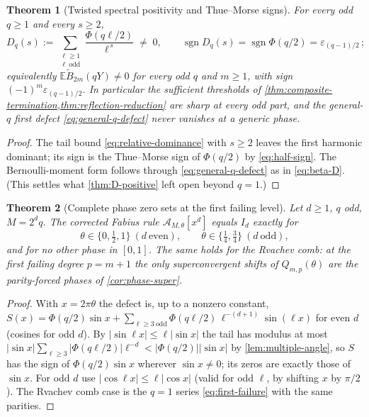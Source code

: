 \documentclass[11pt,oneside]{article}
\numberwithin{equation}{section}
\newtheorem{theorem}{Theorem}[section]
\theoremstyle{definition}
\theoremstyle{remark}
\newcommand{\E}{\mathbb E}
\newcommand{\eps}{\varepsilon}
\newcommand{\abs}[1]{\left\lvert #1\right\rvert}
\newcommand{\sgn}{\operatorname{sgn}}
\begin{document}
\begin{theorem}[Twisted spectral positivity and Thue--Morse signs]
\label{thm:twisted-D-positive}
For every odd $q\ge1$ and every $s\ge2$,
\begin{equation}
 D_q(s):=\sum_{\substack{\ell\ge1\\ \ell\ \mathrm{odd}}}
 \frac{\Phi(q\ell/2)}{\ell^{\,s}}
 \;\ne\;0,
 \qquad
 \sgn D_q(s)=\sgn\Phi(q/2)=\eps_{(q-1)/2}\,;
 \label{eq:twisted-positive}
\end{equation}
equivalently $\E\widetilde B_{2m}(qY)\ne0$ for every odd $q$ and
$m\ge1$, with sign $(-1)^{m}\eps_{(q-1)/2}$.  In particular the
sufficient thresholds of
\cref{thm:composite-termination,thm:reflection-reduction} are sharp
at \emph{every} odd part, and the general-$q$ first defect
\eqref{eq:general-q-defect} never vanishes at a generic phase.
\end{theorem}

\begin{proof}
The tail bound \eqref{eq:relative-dominance} with $s\ge2$ leaves the
first harmonic dominant; its sign is the Thue--Morse sign of
$\Phi(q/2)$ by \eqref{eq:half-sign}.  The Bernoulli-moment form
follows through \eqref{eq:general-q-defect} as in \eqref{eq:beta-D}.
(This settles what \cref{thm:D-positive} left open beyond $q=1$.)
\end{proof}

\begin{theorem}[Complete phase zero sets at the first failing level]
\label{thm:phase-zero-set}
Let $d\ge1$, $q$ odd, $M=2^{d}q$.  The corrected Fabius rule
$\mathcal A_{M,\theta}[x^{d}]$ equals $I_d$ exactly for
\begin{equation}
 \theta\in\{0,\tfrac12,1\}\ (d\ \text{even}),
 \qquad
 \theta\in\{\tfrac14,\tfrac34\}\ (d\ \text{odd}),
 \label{eq:zero-set}
\end{equation}
and for \emph{no other} phase in $[0,1]$.  The same holds for the
Rvachev comb: at the first failing degree $p=m+1$ the only
superconvergent shifts of $Q_{m,p}(\theta)$ are the parity-forced
phases of \cref{cor:phase-super}.
\end{theorem}

\begin{proof}
With $x=2\pi\theta$ the defect is, up to a nonzero constant,
$S(x)=\Phi(q/2)\sin x+\sum_{\ell\ge3\ \mathrm{odd}}
\Phi(q\ell/2)\,\ell^{-(d+1)}\sin(\ell x)$ for even $d$ (cosines for
odd $d$).  By $\abs{\sin\ell x}\le\ell\abs{\sin x}$ the tail has
modulus at most
$\abs{\sin x}\sum_{\ell\ge3}\abs{\Phi(q\ell/2)}\ell^{-d}
<\abs{\Phi(q/2)}\abs{\sin x}$ by
\cref{lem:multiple-angle}, so $S$ has the sign of
$\Phi(q/2)\sin x$ wherever $\sin x\ne0$; its zeros are exactly those
of $\sin x$.  For odd $d$ use $\abs{\cos\ell x}\le\ell\abs{\cos x}$
(valid for odd $\ell$, by shifting $x$ by $\pi/2$).  The Rvachev comb
case is the $q=1$ series \eqref{eq:first-failure} with the same
parities.
\end{proof}
\end{document}

